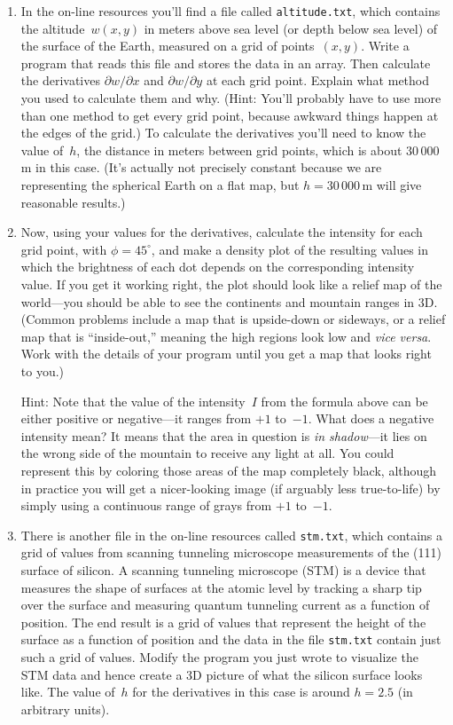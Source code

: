 \documentclass[12pt]{article}
\begin{document}
\begin{exercises}
\begin{enumerate}\setlength{\itemsep}{0pt}
\item In the on-line resources you'll find a file called
  \verb|altitude.txt|, which contains the altitude~$w(x,y)$ in meters above
  sea level (or depth below sea level) of the surface of the Earth,
  measured on a grid of points~$(x,y)$.  Write a program that reads this
  file and stores the data in an array.  Then calculate the derivatives
  $\partial w/\partial x$ and $\partial w/\partial y$ at each grid point.
  Explain what method you used to calculate them and why.  (Hint: You'll
  probably have to use more than one method to get every grid point,
  because awkward things happen at the edges of the grid.)  To calculate
  the derivatives you'll need to know the value of~$h$, the distance in
  meters between grid points, which is about $30\,000\,$m in this case.
  (It's actually not precisely constant because we are representing the
  spherical Earth on a flat map, but $h=30\,000\,$m will give reasonable
  results.)
\item Now, using your values for the derivatives, calculate the intensity
  for each grid point, with $\phi=45^\circ$, and make a density plot of the
  resulting values in which the brightness of each dot depends on the
  corresponding intensity value.  If you get it working right, the plot
  should look like a relief map of the world---you should be able to see
  the continents and mountain ranges in 3D.  (Common problems include a map
  that is upside-down or sideways, or a relief map that is ``inside-out,''
  meaning the high regions look low and \textit{vice versa}.  Work with the
  details of your program until you get a map that looks right to you.)

  Hint: Note that the value of the intensity~$I$ from the formula above can be either positive or negative---it ranges from $+1$ to~$-1$.  What does a negative intensity mean?  It means that the area in question is \emph{in shadow}---it lies on the wrong side of the mountain to receive any light at all.  You could represent this by coloring those areas of the map completely black, although in practice you will get a nicer-looking image (if arguably less true-to-life) by simply using a continuous range of grays from $+1$ to~$-1$.
\item There is another file in the on-line resources called \verb|stm.txt|,
  which contains a grid of values from scanning tunneling microscope
  measurements of the (111) surface of silicon.  A scanning
  tunneling microscope (STM) is a device that measures the shape of
  surfaces at the atomic level by tracking a sharp tip over the surface and
  measuring quantum tunneling current as a function of position.  The end
  result is a grid of values that represent the height of the surface as a
  function of position and the data in the file \verb|stm.txt| contain just
  such a grid of values.  Modify the program you just wrote to visualize
  the STM data and hence create a 3D picture of what the silicon
  surface looks like.  The value of~$h$ for the derivatives in this case is
  around $h=2.5$ (in arbitrary units).
\end{enumerate}

\end{exercises}
\end{document}
